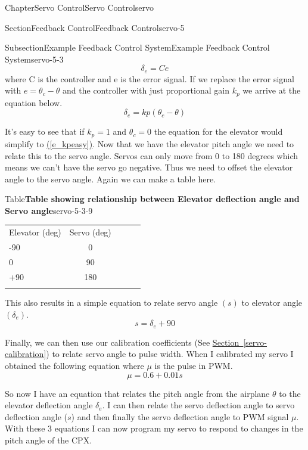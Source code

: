 \documentclass[oneside,10pt,]{book}
\newcommand{\tabularfont}{\relax}
\newcommand{\xreffont}{\relax}
\newcommand{\linkhilite}[1]{\underline{#1}}
\numberwithin{equation}{section}
\newcommand{\hrulethin}  {\noalign{\hrule height 0.04em}}
\begin{document}
\begin{chapterptx}{Chapter}{Servo Control}{}{Servo Control}{}{}{servo}
\begin{sectionptx}{Section}{Feedback Control}{}{Feedback Control}{}{}{servo-5}
\begin{subsectionptx}{Subsection}{Example Feedback Control System}{}{Example Feedback Control System}{}{}{servo-5-3}
\begin{equation}
\delta_e = Ce\label{servo-5-3-7-1}
\end{equation}
where C is the controller and e is the error signal. If we replace the error signal with \(e=\theta_c-\theta\) and the controller with just proportional gain \(k_p\) we arrive at the equation below.%
\begin{equation}
\delta_e = kp(\theta_c-\theta)\label{servo-5-3-7-4}
\end{equation}
%
\par
It's easy to see that if \(k_p=1\) and \(\theta_c=0\) the equation for the elevator would simplify to \hyperref[e_kpeasy]{\linkhilite{({\xreffont\ref{e_kpeasy}})}}. Now that we have the elevator pitch angle we need to relate this to the servo angle. Servos can only move from 0 to 180 degrees which means we can't have the servo go negative. Thus we need to offset the elevator angle to the servo angle. Again we can make a table here.%
\begin{tableptx}{Table}{\textbf{Table showing relationship between Elevator deflection angle and Servo angle}}{servo-5-3-9}{}%
\centering%
{\tabularfont%
\begin{tabular}{AcAcA}\hrulethin
Elevator (deg)&Servo (deg)\tabularnewline\hrulethin
-90&0\tabularnewline\hrulethin
0&90\tabularnewline\hrulethin
+90&180\tabularnewline\hrulethin
\end{tabular}
}%
\end{tableptx}%
This also results in a simple equation to relate servo angle \((s)\) to elevator angle \((\delta_e)\).%
\begin{equation}
s = \delta_e + 90\label{servo-5-3-10-3}
\end{equation}
%
\par
Finally, we can then use our calibration coefficients (See \hyperref[servo-calibration]{\linkhilite{Section~{\xreffont\ref{servo-calibration}}}}) to relate servo angle to pulse width. When I calibrated my servo I obtained the following equation where \(\mu\) is the pulse in PWM.%
\begin{equation}
\mu = 0.6 + 0.01s\label{servo-5-3-11-3}
\end{equation}
%
\par
So now I have an equation that relates the pitch angle from the airplane \(\theta\) to the elevator deflection angle \(\delta_e\). I can then relate the servo deflection angle to servo deflection angle (\(s\)) and then finally the servo deflection angle to PWM signal \(\mu\). With these 3 equations I can now program my servo to respond to changes in the pitch angle of the CPX.%

\end{subsectionptx}
\end{sectionptx}
\end{chapterptx}
\end{document}
